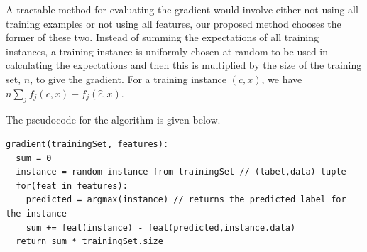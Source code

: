 \documentclass{article} %
\begin{document}
A tractable method for evaluating the gradient would involve either not using all training examples or not using all features, our proposed method chooses the former of these two. Instead of summing the expectations of all training instances, a training instance is uniformly chosen at random to be used in calculating the expectations and then this is multiplied by the size of the training set, $n$, to give the gradient. For a training instance $(c,x)$, we have $n \sum_j f_j (c, x) - f_j (\hat{c}, x)$.

The pseudocode for the algorithm is given below.

\begin{verbatim}
gradient(trainingSet, features):
  sum = 0
  instance = random instance from trainingSet // (label,data) tuple
  for(feat in features):
    predicted = argmax(instance) // returns the predicted label for the instance
    sum += feat(instance) - feat(predicted,instance.data)
  return sum * trainingSet.size
\end{verbatim}
\end{document}
